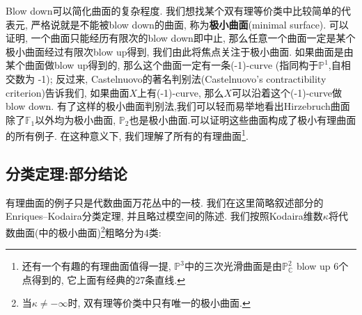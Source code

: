 \documentclass[UTF8,12pt,twoside]{article}
\theoremstyle{definition}
\newcommand{\CC}{\mathbb{C}}  %
\newcommand{\PCC}{\mathbb{P}_{\CC}^2} %
\numberwithin{equation}{section}
\begin{document}
Blow down可以简化曲面的复杂程度. 我们想找某个双有理等价类中比较简单的代表元, 严格说就是不能被blow down的曲面, 称为\textbf{极小曲面}(minimal surface). 可以证明, 一个曲面只能经历有限次的blow down即中止, 那么任意一个曲面一定是某个极小曲面经过有限次blow up得到, 我们由此将焦点关注于极小曲面. 如果曲面是由某个曲面做blow up得到的, 那么这个曲面一定有一条(-1)-curve (指同构于$\mathbb{P}^1$,自相交数为 -1);      反过来, Castelnuovo的著名判别法(Castelnuovo's contractibility criterion)告诉我们, 如果曲面$X$上有(-1)-curve, 那么$X$可以沿着这个(-1)-curve做blow down. 有了这样的极小曲面判别法,我们可以轻而易举地看出Hirzebruch曲面除了$\mathbb{F}_1$以外均为极小曲面, $\mathbb{P}_2$也是极小曲面.可以证明这些曲面构成了极小有理曲面的所有例子. 在这种意义下, 我们理解了所有的有理曲面\footnote{还有一个有趣的有理曲面值得一提, $\mathbb{P}^3$中的三次光滑曲面是由$\PCC$ blow up 6个点得到的, 它上面有经典的27条直线.}.

\subsection{分类定理:部分结论}
有理曲面的例子只是代数曲面万花丛中的一枝. 我们在这里简略叙述部分的Enriques–Kodaira分类定理, 并且略过模空间的陈述. 我们按照Kodaira维数$\kappa$将代数曲面(中的极小曲面)\footnote{当$\kappa\neq-\infty$时, 双有理等价类中只有唯一的极小曲面.}粗略分为4类: 
\end{document}
